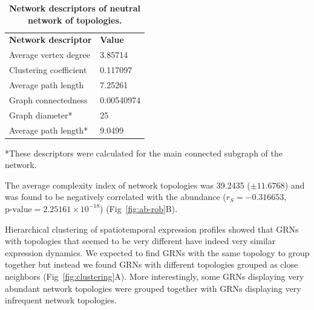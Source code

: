 \documentclass[10pt,letterpaper]{article}
\newlength\savedwidth
\newcommand\thickhline{\noalign{\global\savedwidth\arrayrulewidth\global\arrayrulewidth 2pt}%
\hline
\noalign{\global\arrayrulewidth\savedwidth}}
\begin{document}
\begin{table}[!ht]
 \centering
 \caption{{\bf Network descriptors of neutral network of topologies.}}
 \begin{tabular}{|l|l|}
 \hline
 {\bf Network descriptor} & {\bf Value}\\ \thickhline
 Average vertex degree  & 3.85714 \\ \hline
 Clustering coefficient~\cite{Watts1998} & 0.117097 \\ \hline
 Average path length    & 7.25261       \\ \hline
 Graph connectedness    & 0.00540974    \\ \hline
 Graph diameter*        & 25            \\ \hline
 Average path length*   & 9.0499        \\ \hline
 \end{tabular}
 \begin{flushleft} *These descriptors were calculated for the main connected
 subgraph of the network.
 \end{flushleft}
 \label{table1}
 \end{table}

The average complexity index of network topologies was 39.2435 ($\pm 11.6768$)
and was found to be negatively correlated with the abundance ($r_S = -0.316653$,
$\text{p-value} = 2.25161\times10^{-18}$) (Fig~\ref{fig:ab-rob}B).

Hierarchical clustering of spatiotemporal expression profiles showed that GRNs
with topologies that seemed to be very different have indeed very similar
expression dynamics. We expected to find GRNs with the same topology to group
together but instead we found GRNs with different topologies grouped as close
neighbors (Fig~\ref{fig:clustering}A). More interestingly, some GRNs displaying
very abundant network topologies were grouped together with GRNs displaying
very infrequent network topologies.
\end{document}
